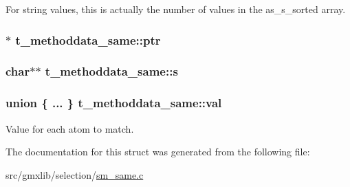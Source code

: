 \-For string values, this is actually the number of values in the {\ttfamily as\-\_\-s\-\_\-sorted} array. \hypertarget{structt__methoddata__same_a0ecb11cbe1431ed1cf7b1e106a0bd916}{
\subsubsection[{ptr}]{$\ast$ {\bf t\-\_\-methoddata\-\_\-same\-::ptr}}}\label{structt__methoddata__same_a0ecb11cbe1431ed1cf7b1e106a0bd916}
\hypertarget{structt__methoddata__same_adeb384c7870701e5e464333563e0927f}{
\subsubsection[{s}]{\setlength{\rightskip}{0pt plus 5cm}char$\ast$$\ast$ {\bf t\-\_\-methoddata\-\_\-same\-::s}}}\label{structt__methoddata__same_adeb384c7870701e5e464333563e0927f}
\hypertarget{structt__methoddata__same_a443d0d6fa094d20591db8b36b8439170}{
\subsubsection[{val}]{\setlength{\rightskip}{0pt plus 5cm}union \{ ... \}                          {\bf t\-\_\-methoddata\-\_\-same\-::val}}}\label{structt__methoddata__same_a443d0d6fa094d20591db8b36b8439170}
\-Value for each atom to match. 

\-The documentation for this struct was generated from the following file\-:\begin{DoxyCompactItemize}
\item 
src/gmxlib/selection/\hyperlink{sm__same_8c}{sm\-\_\-same.\-c}\end{DoxyCompactItemize}
